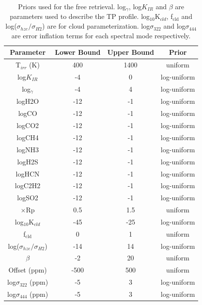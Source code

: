 \documentclass[sn-standardnature]{sn-jnl}%
\begin{document}
\begin{table}[]
\begin{tabular}{cccc}
\hline
\textbf{Parameter} & \textbf{Lower Bound} & \textbf{Upper Bound} & \textbf{Prior} \\ \hline
T$_{irr}$ (K)	&	400	&	1400	&	uniform	\\
log$K_{IR}$	&	-4	&	0	&	log-uniform	\\
log$_\gamma$	&	-4	&	4	&	log-uniform	\\
logH2O	&	-12	&	-1	&	log-uniform	\\
logCO	&	-12	&	-1	&	log-uniform	\\
logCO2	&	-12	&	-1	&	log-uniform	\\
logCH4	&	-12	&	-1	&	log-uniform	\\
logNH3	&	-12	&	-1	&	log-uniform	\\
logH2S	&	-12	&	-1	&	log-uniform	\\
logHCN	&	-12	&	-1	&	log-uniform	\\
logC2H2	&	-12	&	-1	&	log-uniform	\\
logSO2	&	-12	&	-1	&	log-uniform	\\
$\times$Rp	&	0.5	&	1.5	&	uniform	\\
log$_{10}$K$_{cld}$	&	-45	&	-25	&	log-uniform	\\
f$_{\text{cld}}$	&	0	&	1	&	uniform	\\
log($\sigma_{hze}/\sigma_{H2}$)	&	-14	&	14	&	log-uniform	\\
$\beta$	&	-2	&	20	&	uniform	\\
Offset (ppm)	&	-500	&	500	&	uniform	\\
log$\sigma_{322}$ (ppm)	&	-5	&	3	&	log-uniform	\\
log$\sigma_{444}$ (ppm)	&	-5	&	3	&	log-uniform	\\
\hline
\end{tabular}
\caption{Priors used for the free retrieval. log$_\gamma$, log$K_{IR}$ and $\beta$ are parameters used to describe the TP profile. log$_{10}$K$_{cld}$, f$_{\text{cld}}$ and log($\sigma_{hze}/\sigma_{H2}$) are for cloud parameterization. log$\sigma_{322}$ and log$\sigma_{444}$ are error inflation terms for each spectral mode respectively.}
\label{SI-free_priors}
\end{table}
\end{document}
